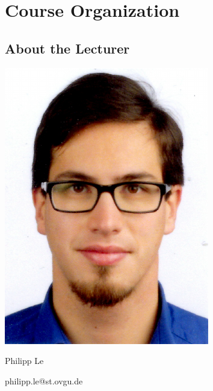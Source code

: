 %
%
%

\chapter{Course Organization}

\section{About the Lecturer}

\begin{minipage}{0.2\linewidth}
	\includegraphics[width=0.8\linewidth]{../chapter00/Philipp.jpg}
\end{minipage}
\hfill
\begin{minipage}{0.75\linewidth}
	Philipp Le
	
	philipp.le@st.ovgu.de
\end{minipage}

\vspace{1em}

